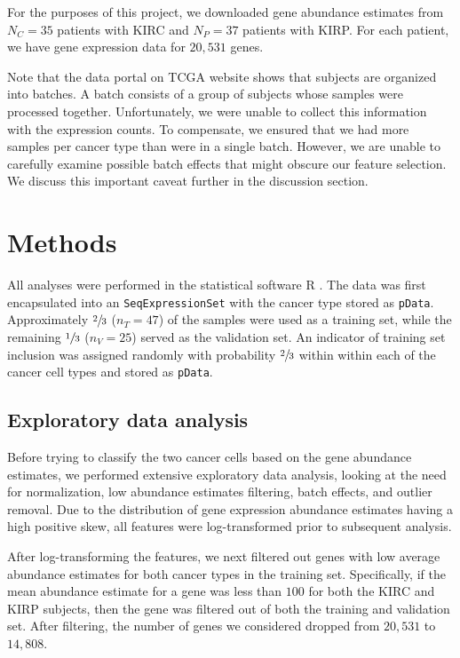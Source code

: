 For the purposes of this project, we downloaded gene abundance estimates from
$N_C =35$ patients with KIRC and $N_P = 37$ patients with KIRP.  For each
patient, we have gene expression data for $20,531$ genes. 

Note that the data portal on TCGA website shows that subjects are organized
into batches.  A batch consists of a group of subjects whose samples were
processed together.  Unfortunately, we were unable to collect this information
with the expression counts. To compensate, we ensured that we had more samples
per cancer type than were in a single batch.  However, we are unable to
carefully examine possible batch effects that might obscure our feature
selection.  We discuss this important caveat further in the discussion
section.

\section{Methods}

All analyses were performed in the statistical software R \cite{rmanual}. The
data was first encapsulated into an \texttt{SeqExpressionSet} \cite{biobase}
with the cancer type stored as \texttt{pData}.
Approximately $\sfrac{2}{3}$ ($n_T = 47$) of the samples were used as a
training set, while the remaining $\sfrac{1}{3}$ ($n_V = 25$) served as the
validation set. An indicator of training set inclusion was assigned randomly
with probability $\sfrac{2}{3}$ within within each of the cancer cell types
and stored as \texttt{pData}.

\subsection*{Exploratory data analysis}

Before trying to classify the two cancer cells based on the gene abundance
estimates, we performed extensive exploratory data analysis, looking at the
need for normalization, low abundance estimates filtering, batch effects, and
outlier removal.  Due to the distribution of gene expression abundance
estimates having a high positive skew, all features were log-transformed prior
to subsequent analysis.

After log-transforming the features, we next filtered out genes with low
average abundance estimates for both cancer types in the training set.
Specifically, if the mean abundance estimate for a gene was less than $100$ for
both the KIRC and KIRP subjects, then the gene was filtered out of both the
training and validation set. After filtering, the number of genes we considered
dropped from $20,531$ to $14,808$.

